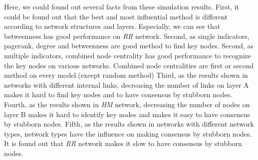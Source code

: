Here, we could found out several facts from these simulation results. First, it could be found out that the best and most influential method is different according to network structures and layers. Especially, we can see that betweenness has good performance on \textit{RR} network. Second, as single indicators, pagerank, degree and betweenness are good method to find key nodes. Second, as multiple indicators, combined node centrality has good performance to recognize the key nodes on various networks. Combined node centralities are first or second method on every model.(except random method)  Third, as the results shown in networks with different internal links, decreasing the number of links on layer A makes it hard to find key nodes and to have consensus by stubborn nodes.  Fourth, as the results shown in \textit{HM} network, decreasing the number of nodes on layer B makes it hard to identify key nodes and makes it easy to have consensus by stubborn nodes. Fifth, as the results shown in networks with different network types, network types have the influence on making consensus by stubborn nodes. It is found out that \textit{RR} network makes it slow to have consensus by stubborn nodes. 




